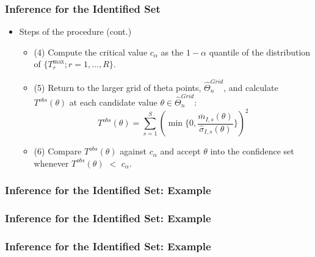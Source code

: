 \begin{frame}
\frametitle{Inference for the Identified Set}

\begin{itemize}
	\item Steps of the procedure (cont.)
	\begin{itemize}
		\item (4) Compute the critical value $c_{\alpha}$ as the $1-\alpha$ quantile of the distribution of $\{T^{\max}_{r}; r=1,\dots,R\}$.
		\item (5) Return to the larger grid of theta points, $\widehat{\Theta }_{n}^{Grid}$, and calculate $T^{obs}(\theta)$ at each candidate value $\theta\in\widehat{\Theta}_{n}^{Grid}$:
		\begin{equation*}
		T^{obs}(\theta)=\sum_{s=1}^{S}(\min\{0,\frac{\overline{m}_{I,s}(\theta)}{\hat{\sigma} _{I,s}(\theta)}\})^{2}
		\end{equation*}
		\item (6) Compare $T^{obs}(\theta)$ against $c_{\alpha}$ and accept $\theta$ into the confidence set whenever $T^{obs}(\theta)$ $<$ $c_{\alpha}$.
	\end{itemize}
\end{itemize}
\end{frame}
\begin{frame}
\frametitle{Inference for the Identified Set: Example}

\begin{figure}[h!]
\begin{center}
\end{center}
\end{figure}	
\end{frame}
\begin{frame}
\frametitle{Inference for the Identified Set: Example}

\begin{figure}[h!]
\begin{center}
\end{center}
\end{figure}	
\end{frame}
\begin{frame}
\frametitle{Inference for the Identified Set: Example}

\begin{figure}[h!]
\begin{center}
\end{center}
\end{figure}	
\end{frame}
